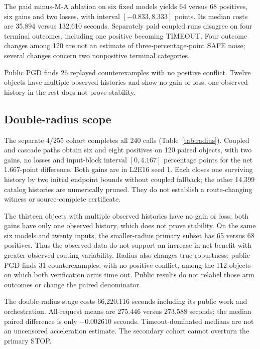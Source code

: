 \documentclass[11pt]{article}
\begin{document}
The paid minus-M-A ablation on six fixed models yields 64 versus 68 positives,
six gains and two losses, with interval $[-0.833,8.333]$ points. Its median costs
are 35.894 versus 132.610 seconds. Separately paid coupled runs disagree on four
terminal outcomes, including one positive becoming TIMEOUT. Four outcome
changes among 120 are not an estimate of three-percentage-point SAFE noise;
several changes concern two nonpositive terminal categories.

Public PGD finds 26 replayed counterexamples with no positive conflict. Twelve
objects have multiple observed histories and show no gain or loss; one observed
history in the rest does not prove stability.

\subsection{Double-radius scope}
The separate $4/255$ cohort completes all 240 calls
(Table~\ref{tab:radius}). Coupled and cascade paths obtain six and eight
positives on 120 paired objects, with two gains, no losses and input-block
interval $[0,4.167]$ percentage points for the net 1.667-point difference.
Both gains are in L2E16 seed 1. Each closes one surviving history by two initial
endpoint bounds without coupled fallback; the other 14,399 catalog histories
are numerically pruned. They do not establish a route-changing witness or
source-complete certificate.

The thirteen objects with multiple observed histories have no gain or loss;
both gains have only one observed history, which does not prove stability.
On the same six models and twenty inputs, the smaller-radius primary subset
has 65 versus 68 positives. Thus the observed data do not support an increase
in net benefit with greater observed routing variability. Radius also changes
true robustness: public PGD finds 31 counterexamples, with no positive conflict,
among the 112 objects on which both verification arms time out. Public results
do not relabel those arm outcomes or change the paired denominator.

The double-radius stage costs 66,220.116 seconds including its public work and
orchestration. All-request means are 275.446 versus 273.588 seconds; the median
paired difference is only $-0.002610$ seconds. Timeout-dominated medians are not
an uncensored acceleration estimate. The secondary cohort cannot overturn the
primary STOP.
\end{document}
